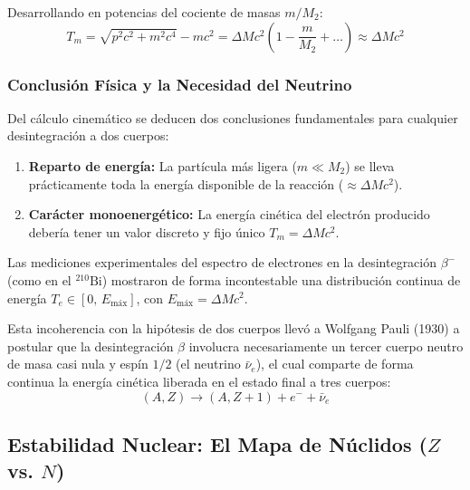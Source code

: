 Desarrollando en potencias del cociente de masas $m/M_2$:
\begin{equation}
T_m = \sqrt{p^2 c^2 + m^2 c^4} - m c^2 = \Delta M c^2 \left( 1 - \frac{m}{M_2} + \dots \right) \approx \Delta M c^2
\end{equation}

\newpage
\subsubsection{Conclusión Física y la Necesidad del Neutrino}

Del cálculo cinemático se deducen dos conclusiones fundamentales para cualquier desintegración a dos cuerpos:
\begin{enumerate}[label=\alph*)]
    \item \textbf{Reparto de energía:} La partícula más ligera ($m \ll M_2$) se lleva prácticamente toda la energía disponible de la reacción ($\approx \Delta M c^2$).
    \item \textbf{Carácter monoenergético:} La energía cinética del electrón producido debería tener un valor discreto y fijo único $T_m = \Delta M c^2$.
\end{enumerate}

\begin{observacion}
Las mediciones experimentales del espectro de electrones en la desintegración $\beta^-$ (como en el $^{210}\text{Bi}$) mostraron de forma incontestable una distribución continua de energía $T_e \in [0, \, E_{\text{máx}}]$, con $E_{\text{máx}} = \Delta M c^2$.

Esta incoherencia con la hipótesis de dos cuerpos llevó a Wolfgang Pauli (1930) a postular que la desintegración $\beta$ involucra necesariamente un tercer cuerpo neutro de masa casi nula y espín $1/2$ (el neutrino $\bar{\nu}_e$), el cual comparte de forma continua la energía cinética liberada en el estado final a tres cuerpos:
\begin{equation}
(A,Z) \longrightarrow (A, Z+1) + e^- + \bar{\nu}_e
\end{equation}
\end{observacion}

\newpage
\subsection{Estabilidad Nuclear: El Mapa de Núclidos (\texorpdfstring{$Z$ vs. $N$}{Z vs. N})}

